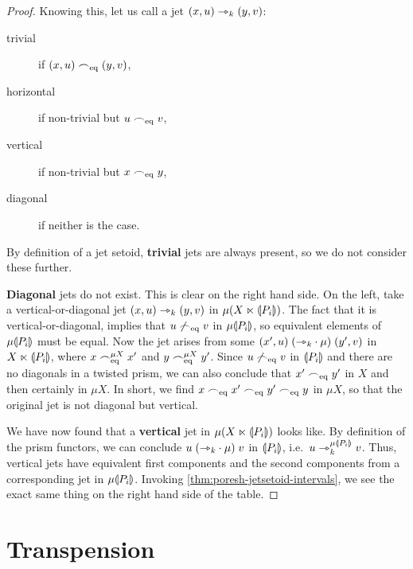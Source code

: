 \documentclass[a4paper]{memoir}
\begin{document}
\begin{proof}
	Knowing this, let us call a jet $(x, u) \rightarrowtriangle_k (y, v)$:
	\begin{description}
		\item[trivial] if $(x, u) \frown_{{\mathrm{eq}}} (y, v)$,
		\item[horizontal] if non-trivial but $u \frown_{{\mathrm{eq}}} v$,
		\item[vertical] if non-trivial but $x \frown_{{\mathrm{eq}}} y$,
		\item[diagonal] if neither is the case.
	\end{description}
	
	By definition of a jet setoid, \textbf{trivial} jets are always present, so we do not consider these further.
	
	\textbf{Diagonal} jets do not exist.
	This is clear on the right hand side.
	On the left, take a vertical-or-diagonal jet $(x, u) \rightarrowtriangle_k (y, v)$ in $\mu(X \ltimes {\llparenthesis P_i \rrparenthesis})$.
	The fact that it is vertical-or-diagonal, implies that $u \not\frown_{{\mathrm{eq}}} v$ in $\mu {\llparenthesis P_i \rrparenthesis}$, so equivalent elements of $\mu {\llparenthesis P_i \rrparenthesis}$ must be equal.
	Now the jet arises from some
	$(x', u) \mathrel{({\rightarrowtriangle}_k \cdot \mu)} (y', v)$ in $X \ltimes {\llparenthesis P_i \rrparenthesis}$, where $x \frown_{{\mathrm{eq}}}^{\mu X} x'$ and $y \frown_{{\mathrm{eq}}}^{\mu X} y'$.
	Since $u \not\frown_{{\mathrm{eq}}} v$ in ${\llparenthesis P_i \rrparenthesis}$ and there are no diagonals in a twisted prism, we can also conclude that $x' \frown_{{\mathrm{eq}}} y'$ in $X$ and then certainly in $\mu X$.
	In short, we find $x \frown_{{\mathrm{eq}}} x' \frown_{{\mathrm{eq}}} y' \frown_{{\mathrm{eq}}} y$ in $\mu X$, so that the original jet is not diagonal but vertical.
	
	We have now found that a \textbf{vertical} jet in $\mu(X \ltimes {\llparenthesis P_i \rrparenthesis})$ looks like.
	By definition of the prism functors, we can conclude $u \mathrel{({\rightarrowtriangle}_k \cdot \mu)} v$ in ${\llparenthesis P_i \rrparenthesis}$, i.e.\ $u \rightarrowtriangle_k^{\mu {\llparenthesis P_i \rrparenthesis}} v$.
	Thus, vertical jets have equivalent first components and the second components from a corresponding jet in $\mu {\llparenthesis P_i \rrparenthesis}$.
	Invoking \cref{thm:poresh-jetsetoid-intervals}, we see the exact same thing on the right hand side of the table.
	
	
\end{proof}

\chapter{Transpension}

\appendix
\end{document}
